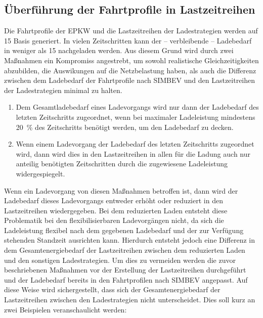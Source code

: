 \subsection{Überführung der Fahrtprofile in Lastzeitreihen}

Die Fahrtprofile der \gls{EPKW} und die Lastzeitreihen der Ladestrategien werden auf \SI{15}{\Minuten} Basis generiert.
In vielen Zeitschritten kann der {--} verbleibende {--} Ladebedarf in weniger als \SI{15}{\Minuten} nachgeladen werden.
Aus diesem Grund wird durch zwei Maßnahmen ein Kompromiss angestrebt, um sowohl realistische Gleichzeitigkeiten abzubilden, die Auswikungen auf die Netzbelastung haben, als auch die Differenz zwischen dem Ladebedarf der Fahrtprofile nach \gls{SIMBEV} und den Lastzeitreihen der Ladestrategien minimal zu halten.

\begin{enumerate}
	\item Dem Gesamtladebedarf eines Ladevorgangs wird nur dann der Ladebedarf des letzten Zeitschritts zugeordnet, wenn bei maximaler Ladeleistung mindestens \SI{20}{\percent} des Zeitschritts benötigt werden, um den Ladebedarf zu decken.
	\item Wenn einem Ladevorgang der Ladebedarf des letzten Zeitschritts zugeordnet wird, dann wird dies in den Lastzeitreihen in allen für die Ladung auch nur anteilig benötigten Zeitschritten durch die zugewiesene Ladeleistung widergespiegelt.
\end{enumerate}

Wenn ein Ladevorgang von diesen Maßnahmen betroffen ist, dann wird der Ladebedarf dieses Ladevorgangs entweder erhöht oder reduziert in den Lastzeitreihen wiedergegeben.
Bei dem reduzierten Laden entsteht diese Problematik bei den flexibilisierbaren Ladevorgängen nicht, da sich die Ladeleistung flexibel nach dem gegebenen Ladebedarf und der zur Verfügung stehenden Standzeit ausrichten kann.
Hierdurch entsteht jedoch eine Differenz in dem Gesamtenergiebedarf der Lastzeitreihen zwischen dem reduzierten Laden und den sonstigen Ladestrategien.
Um dies zu vermeiden werden die zuvor beschriebenen Maßnahmen vor der Erstellung der Lastzeitreihen durchgeführt und der Ladebedarf bereits in den Fahrtprofilen nach \gls{SIMBEV} angepasst.
Auf diese Weise wird sichergestellt, dass sich der Gesamtenergiebedarf der Lastzeitreihen zwischen den Ladestrategien nicht unterscheidet.
Dies soll kurz an zwei Beispielen veranschaulicht werden:

